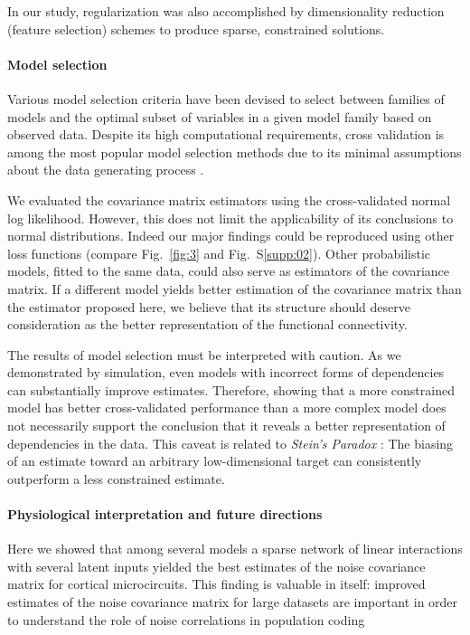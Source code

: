 \documentclass[10pt]{article}
\begin{document}
In our study, regularization was also accomplished by dimensionality reduction (feature selection) schemes to produce sparse, constrained solutions.


\paragraph{Model selection}
Various model selection criteria have been devised to select between families of models and the optimal subset of variables in a given model family based on observed data. Despite its high computational requirements, cross validation is among the most popular model selection methods due to its minimal assumptions about the data generating process \cite{Arlot:2010}.

We evaluated the covariance matrix estimators using the cross-validated normal log likelihood.  However, this does not limit the applicability of its conclusions to normal distributions. Indeed our major findings could be reproduced using other loss functions (compare Fig.~\ref{fig:3} and Fig.~S\ref{supp:02}).  Other probabilistic models, fitted to the same data, could also serve as estimators of the covariance matrix.  If a different model yields better estimation of the covariance matrix than the estimator proposed here, we believe that its structure should deserve consideration as the better representation of the functional connectivity.

The results of model selection must be interpreted with caution.  As we demonstrated by simulation, even models with incorrect forms of dependencies can substantially improve estimates.  Therefore, showing that a more constrained model has better cross-validated performance than a more complex model does not necessarily support the conclusion that it reveals a better representation of dependencies in the data.  This caveat is related to \emph{Stein's Paradox} \cite{Efron:1977}: The biasing of an estimate toward an arbitrary low-dimensional target can consistently outperform a less constrained estimate.

\paragraph{Physiological interpretation and future directions}

Here we showed that among several models a sparse network of linear interactions with several latent inputs yielded the best estimates of the noise covariance matrix for cortical microcircuits.  This finding is valuable in itself: improved estimates of the noise covariance matrix for large datasets are important in order to understand the role of noise correlations in population coding \cite{Abbott:1999, Sompolinsky:2001, Averbeck:2006, Ecker:2011}  
\end{document}
